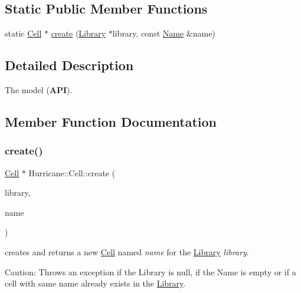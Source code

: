\subsection*{Static Public Member Functions}
\begin{DoxyCompactItemize}
\item 
static \mbox{\hyperlink{classHurricane_1_1Cell}{Cell}} $\ast$ \mbox{\hyperlink{classHurricane_1_1Cell_ad803afb3e52bea3bf3d520e353b162e0}{create}} (\mbox{\hyperlink{classHurricane_1_1Library}{Library}} $\ast$library, const \mbox{\hyperlink{classHurricane_1_1Name}{Name}} \&name)
\end{DoxyCompactItemize}


\subsection{Detailed Description}
The model ({\bfseries A\+PI}). 

\subsection{Member Function Documentation}
\mbox{\label{classHurricane_1_1Cell_ad803afb3e52bea3bf3d520e353b162e0}} 
\subsubsection{\texorpdfstring{create()}{create()}}
{\footnotesize\ttfamily \mbox{\hyperlink{classHurricane_1_1Cell}{Cell}} $\ast$ Hurricane\+::\+Cell\+::create (\begin{DoxyParamCaption}\item[{\mbox{\hyperlink{classHurricane_1_1Library}{Library}} $\ast$}]{library,  }\item[{const \mbox{\hyperlink{classHurricane_1_1Name}{Name}} \&}]{name }\end{DoxyParamCaption})\hspace{0.3cm}{\ttfamily [static]}}

creates and returns a new \mbox{\hyperlink{classHurricane_1_1Cell}{Cell}} named {\itshape name} for the \mbox{\hyperlink{classHurricane_1_1Library}{Library}} {\itshape library}.

\begin{DoxyParagraph}{Caution\+: Throws an exception if the Library is null, if the Name is}
empty or if a cell with same name already exists in the \mbox{\hyperlink{classHurricane_1_1Library}{Library}}. 
\end{DoxyParagraph}
\mbox{\label{classHurricane_1_1Cell_aa84b97773160a28d3dd69df1e261eecf}} 
